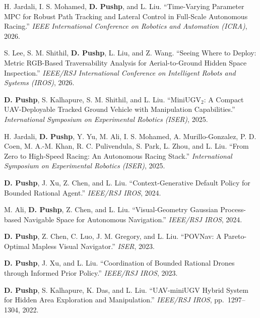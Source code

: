 \documentclass[11pt,letterpaper]{article}
\newcommand{\me}{\textbf{D. Pushp}}
\begin{document}
\begin{enumerate}[label={[C\arabic*]}]

    \item H. Jardali, I. S. Mohamed, \me, and L. Liu.
    ``Time-Varying Parameter MPC for Robust Path Tracking
    and Lateral Control in Full-Scale Autonomous Racing.''
    \emph{IEEE International Conference on Robotics and
    Automation (ICRA)}, 2026.

    \item S. Lee, S. M. Shithil, \me, L. Liu, and Z. Wang.
    ``Seeing Where to Deploy: Metric RGB-Based Traversability
    Analysis for Aerial-to-Ground Hidden Space Inspection.''
    \emph{IEEE/RSJ International Conference on Intelligent
    Robots and Systems (IROS)}, 2026.

    \item \me, S. Kalhapure, S. M. Shithil, and L. Liu.
    ``MiniUGV$_2$: A Compact UAV-Deployable Tracked Ground
    Vehicle with Manipulation Capabilities.''
    \emph{International Symposium on Experimental Robotics
    (ISER)}, 2025.

    \item H. Jardali, \me, Y. Yu, M. Ali, I. S. Mohamed,
    A. Murillo-Gonzalez, P. D. Coen, M. A.-M. Khan,
    R. C. Pulivendula, S. Park, L. Zhou, and L. Liu.
    ``From Zero to High-Speed Racing: An Autonomous
    Racing Stack.''
    \emph{International Symposium on Experimental Robotics
    (ISER)}, 2025.

    \item \me, J. Xu, Z. Chen, and L. Liu.
    ``Context-Generative Default Policy for Bounded
    Rational Agent.''
    \emph{IEEE/RSJ IROS}, 2024.

    \item M. Ali, \me, Z. Chen, and L. Liu.
    ``Visual-Geometry Gaussian Process-based Navigable
    Space for Autonomous Navigation.''
    \emph{IEEE/RSJ IROS}, 2024.

    \item \me, Z. Chen, C. Luo, J. M. Gregory, and L. Liu.
    ``POVNav: A Pareto-Optimal Mapless Visual Navigator.''
    \emph{ISER}, 2023.

    \item \me, J. Xu, and L. Liu.
    ``Coordination of Bounded Rational Drones through
    Informed Prior Policy.''
    \emph{IEEE/RSJ IROS}, 2023.

    \item \me, S. Kalhapure, K. Das, and L. Liu.
    ``UAV-miniUGV Hybrid System for Hidden Area Exploration
    and Manipulation.''
    \emph{IEEE/RSJ IROS}, pp.\ 1297--1304, 2022.


\end{enumerate}
\end{document}
